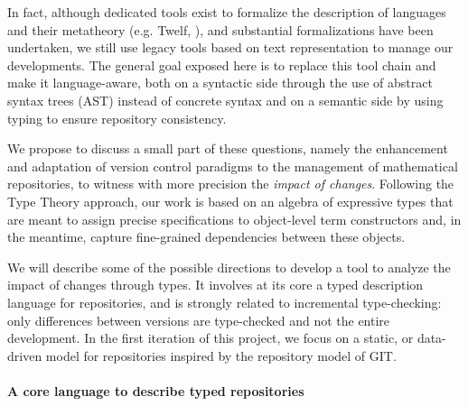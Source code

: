 \documentclass{article}
\newcommand{\remplan}[1]{\noindent\textcolor{bwblue}{$\triangleright$ \textbf{#1}}}
\newcommand{\remtext}[1]{\textcolor{bwgreen}{$\triangleright$ \textsl{#1}}}
\renewcommand{\remplan}[1]{}
\renewcommand{\remtext}[1]{}
\begin{document}
In fact, although dedicated tools exist to formalize the description
of languages and their metatheory (e.g. \textsf{Twelf},
{\cite{pfenning1999system}}), and substantial formalizations have been
undertaken\cite{lee07}, we still use legacy tools based on text
representation to manage our developments. The general goal exposed
here is to replace this tool chain and make it language-aware, both on
a syntactic side through the use of abstract syntax trees (AST) instead of
concrete syntax and on a semantic side by using typing to ensure 
repository consistency.



We propose to discuss a small part of these questions, namely the
enhancement and adaptation of version control paradigms to the
management of mathematical repositories, to witness with more
precision the \emph{impact of changes}. Following the Type Theory
approach, our work is based on an algebra of expressive types that are
meant to assign precise specifications to object-level term
constructors and, in the meantime, capture fine-grained
dependencies between these objects.


We will describe some of the possible directions to develop a tool to
analyze the impact of changes through types. It involves at its core a
typed description language for repositories, and is strongly related
to incremental type-checking: only differences between versions are
type-checked and not the entire development. In the first iteration of
this project, we focus on a static, or data-driven model for
repositories inspired by the repository model of \textsf{GIT}.

\paragraph{A core language to describe typed repositories}
\end{document}

